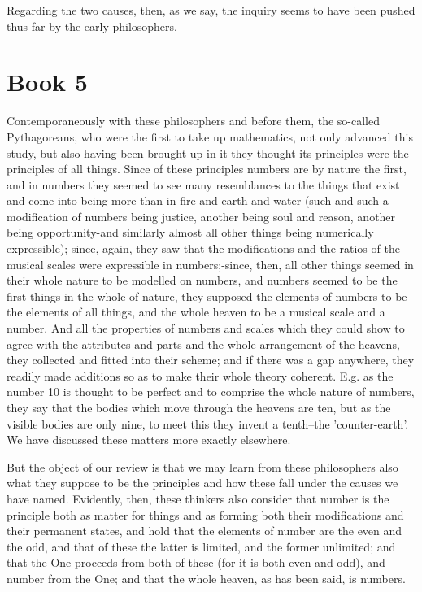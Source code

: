 \documentclass[oneside, 17pt, dvipsnames]{extbook}
\begin{document}
Regarding the two causes, then, as we say, the inquiry seems to have been pushed thus far by the early philosophers.





\newpage
\section{Book 5}

Contemporaneously with these philosophers and before them, the so-called Pythagoreans, who were the first to take up mathematics, not only advanced this study, but also having been brought up in it they thought its principles were the principles of all things. Since of these principles numbers are by nature the first, and in numbers they seemed to see many resemblances to the things that exist and come into being-more than in fire and earth and water (such and such a modification of numbers being justice, another being soul and reason, another being opportunity-and similarly almost all other things being numerically expressible); since, again, they saw that the modifications and the ratios of the musical scales were expressible in numbers;-since, then, all other things seemed in their whole nature to be modelled on numbers, and numbers seemed to be the first things in the whole of nature, they supposed the elements of numbers to be the elements of all things, and the whole heaven to be a musical scale and a number. And all the properties of numbers and scales which they could show to agree with the attributes and parts and the whole arrangement of the heavens, they collected and fitted into their scheme; and if there was a gap anywhere, they readily made additions so as to make their whole theory coherent. E.g. as the number 10 is thought to be perfect and to comprise the whole nature of numbers, they say that the bodies which move through the heavens are ten, but as the visible bodies are only nine, to meet this they invent a tenth--the 'counter-earth'. We have discussed these matters more exactly elsewhere.

But the object of our review is that we may learn from these philosophers also what they suppose to be the principles and how these fall under the causes we have named. Evidently, then, these thinkers also consider that number is the principle both as matter for things and as forming both their modifications and their permanent states, and hold that the elements of number are the even and the odd, and that of these the latter is limited, and the former unlimited; and that the One proceeds from both of these (for it is both even and odd), and number from the One; and that the whole heaven, as has been said, is numbers.
\end{document}
